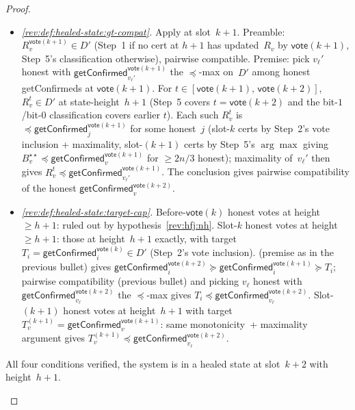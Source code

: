\ifx\litemode\undefined\documentclass{article}\fi
\newcommand{\vote}{\mathsf{vote}}
\newcommand{\getConfirmed}{\textsf{getConfirmed}\xspace}
\theoremstyle{plain}
\theoremstyle{definition}
\theoremstyle{remark}
\begin{document}
\begin{proof}
\begin{description}
\begin{description}
\begin{itemize}
  \item \emph{\ref{rev:def:healed-state:gt-compat}.}
  Apply  at slot~$k+1$. Preamble: $R_v^{\vote(k+1)} \in D'$ (Step~1 if no cert at $h+1$ has updated~$R_v$ by $\vote(k+1)$, Step~5's classification otherwise), pairwise compatible. Premise: pick $v_\ell'$ honest with $\getConfirmed_{v_\ell'}^{\vote(k+1)}$ the $\preceq$-max on~$D'$ among honest \getConfirmed{}s at $\vote(k+1)$. For $t \in [\vote(k+1),\, \vote(k+2)]$, $R_v^t \in D'$ at state-height~$h+1$ (Step~5 covers $t = \vote(k+2)$ and the bit-$1$/bit-$0$ classification covers earlier $t$). Each such $R_v^t$ is~$\preceq \getConfirmed_j^{\vote(k+1)}$ for some honest~$j$ (slot-$k$ certs by Step~2's vote inclusion + maximality, slot-$(k+1)$ certs by Step~5's $\arg\max$ giving $B^{\star\star}_v \preceq \getConfirmed_v^{\vote(k+1)}$ for $\geq 2n/3$ honest); maximality of~$v_\ell'$ then gives $R_v^t \preceq \getConfirmed_{v_\ell'}^{\vote(k+1)}$. The conclusion gives pairwise compatibility of the honest $\getConfirmed_v^{\vote(k+2)}$.

  \item \emph{\ref{rev:def:healed-state:target-cap}.}
  Before-$\vote(k)$ honest votes at height~$\geq h+1$: ruled out by hypothesis~\ref{rev:hfj:nh}. Slot-$k$ honest votes at height~$\geq h+1$: those at height~$h+1$ exactly, with target $T_i = \getConfirmed_i^{\vote(k)} \in D'$ (Step~2's vote inclusion).  (premise as in the previous bullet) gives $\getConfirmed_i^{\vote(k+2)} \succeq \getConfirmed_i^{\vote(k+1)} \succeq T_i$; pairwise compatibility (previous bullet) and picking $v_\ell$ honest with $\getConfirmed_{v_\ell}^{\vote(k+2)}$ the $\preceq$-max gives $T_i \preceq \getConfirmed_{v_\ell}^{\vote(k+2)}$. Slot-$(k+1)$ honest votes at height~$h+1$ with target $T_v^{(k+1)} = \getConfirmed_v^{\vote(k+1)}$: same monotonicity~+ maximality argument gives $T_v^{(k+1)} \preceq \getConfirmed_{v_\ell}^{\vote(k+2)}$.
\end{itemize}
All four conditions verified, the system is in a healed state at slot~$k+2$ with height~$h+1$.


\item[{Case 2.B: $\sigma[\getConfirmed_{v_*}^{\vote(k+1)}].h = h+2$ for some honest~$v_*$.}]\hfill

\begin{figure}[H]
\centering
{}
\end{figure}
\end{description}
\end{description}
\end{proof}
\end{document}
